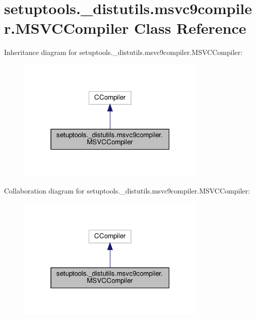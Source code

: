 \hypertarget{classsetuptools_1_1__distutils_1_1msvc9compiler_1_1MSVCCompiler}{}\section{setuptools.\+\_\+distutils.\+msvc9compiler.\+M\+S\+V\+C\+Compiler Class Reference}
\label{classsetuptools_1_1__distutils_1_1msvc9compiler_1_1MSVCCompiler}


Inheritance diagram for setuptools.\+\_\+distutils.\+msvc9compiler.\+M\+S\+V\+C\+Compiler\+:
\nopagebreak
\begin{figure}[H]
\begin{center}
\leavevmode
\includegraphics[width=256pt]{classsetuptools_1_1__distutils_1_1msvc9compiler_1_1MSVCCompiler__inherit__graph}
\end{center}
\end{figure}


Collaboration diagram for setuptools.\+\_\+distutils.\+msvc9compiler.\+M\+S\+V\+C\+Compiler\+:
\nopagebreak
\begin{figure}[H]
\begin{center}
\leavevmode
\includegraphics[width=256pt]{classsetuptools_1_1__distutils_1_1msvc9compiler_1_1MSVCCompiler__coll__graph}
\end{center}
\end{figure}
